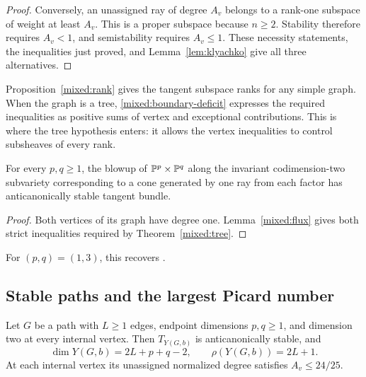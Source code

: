 \begin{proof}
Conversely, an unassigned ray of degree $A_v$ belongs to a rank-one
subspace of weight at least $A_v$. This is a proper subspace because
$n\ge2$. Stability therefore requires $A_v<1$, and semistability
requires $A_v\le1$. These necessity statements, the inequalities just
proved, and Lemma~\ref{lem:klyachko} give all three alternatives.
\end{proof}

Proposition~\ref{mixed:rank} gives the tangent subspace ranks for any
simple graph. When the graph is a tree,
\eqref{mixed:boundary-deficit} expresses the required inequalities as
positive sums of vertex and exceptional contributions. This is where
the tree hypothesis enters: it allows the vertex inequalities to control
subsheaves of every rank.

\begin{corollary}\label{mixed:single-edge}
For every $p,q\ge1$, the blowup of $\mathbb{P}^p\times\mathbb{P}^q$ along the invariant
codimension-two subvariety corresponding to a cone generated by one ray
from each factor has anticanonically stable tangent bundle.
\end{corollary}

\begin{proof}
Both vertices of its graph have degree one. Lemma~\ref{mixed:flux}
gives both strict inequalities required by Theorem~\ref{mixed:tree}.
\end{proof}

For $(p,q)=(1,3)$, this recovers
\cite[Proposition~5.6.1(2)]{DasguptaDeyKhan2020}.

\subsection{Stable paths and the largest Picard number}

\begin{theorem}\label{mixed:paths}
Let $G$ be a path with $L\ge1$ edges, endpoint dimensions $p,q\ge1$,
and dimension two at every internal vertex. Then $T_{Y(G,b)}$ is
anticanonically stable, and
\begin{equation}\label{mixed:path-dimension}
 \dim Y(G,b)=2L+p+q-2,\qquad \rho(Y(G,b))=2L+1.
\end{equation}
At each internal vertex its unassigned normalized degree satisfies
$A_v\le24/25$.
\end{theorem}

